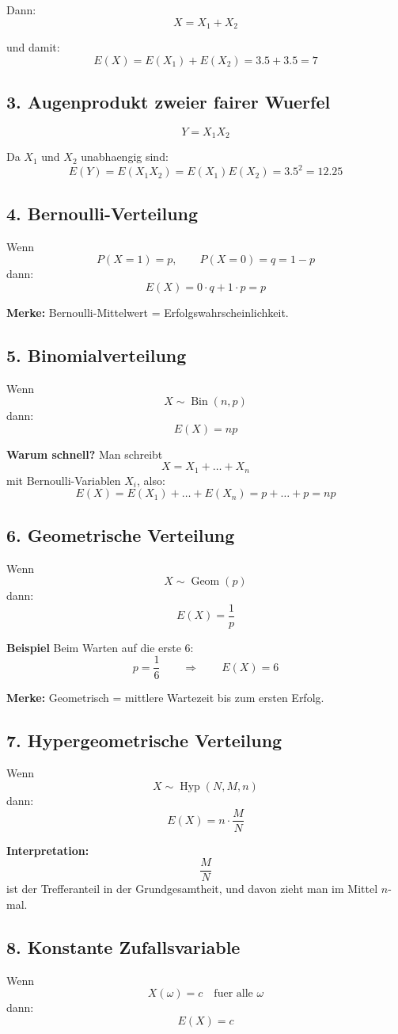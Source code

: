 \documentclass[a4paper,11pt]{article}
\begin{document}
Dann:
\[
X=X_1+X_2
\]

und damit:
\[
E(X)=E(X_1)+E(X_2)=3.5+3.5=7
\]

\subsection{3. Augenprodukt zweier fairer Wuerfel}
\[
Y=X_1X_2
\]

Da $X_1$ und $X_2$ unabhaengig sind:
\[
E(Y)=E(X_1X_2)=E(X_1)E(X_2)=3.5^2=12.25
\]

\subsection{4. Bernoulli-Verteilung}
Wenn
\[
P(X=1)=p,\qquad P(X=0)=q=1-p
\]
dann:
\[
E(X)=0\cdot q+1\cdot p=p
\]

\textbf{Merke:}
Bernoulli-Mittelwert = Erfolgswahrscheinlichkeit.

\subsection{5. Binomialverteilung}
Wenn
\[
X \sim \operatorname{Bin}(n,p)
\]
dann:
\[
E(X)=np
\]

\textbf{Warum schnell?}
Man schreibt
\[
X=X_1+\dots+X_n
\]
mit Bernoulli-Variablen $X_i$, also:
\[
E(X)=E(X_1)+\dots+E(X_n)=p+\dots+p=np
\]

\subsection{6. Geometrische Verteilung}
Wenn
\[
X \sim \operatorname{Geom}(p)
\]
dann:
\[
E(X)=\frac{1}{p}
\]

\textbf{Beispiel}
Beim Warten auf die erste $6$:
\[
p=\frac16
\qquad \Rightarrow \qquad
E(X)=6
\]

\textbf{Merke:}
Geometrisch = mittlere Wartezeit bis zum ersten Erfolg.

\subsection{7. Hypergeometrische Verteilung}
Wenn
\[
X \sim \operatorname{Hyp}(N,M,n)
\]
dann:
\[
E(X)=n\cdot \frac{M}{N}
\]

\textbf{Interpretation:}
\[
\frac{M}{N}
\]
ist der Trefferanteil in der Grundgesamtheit, und davon zieht man im Mittel $n$-mal.

\subsection{8. Konstante Zufallsvariable}
Wenn
\[
X(\omega)=c \quad \text{fuer alle } \omega
\]
dann:
\[
E(X)=c
\]
\end{document}
